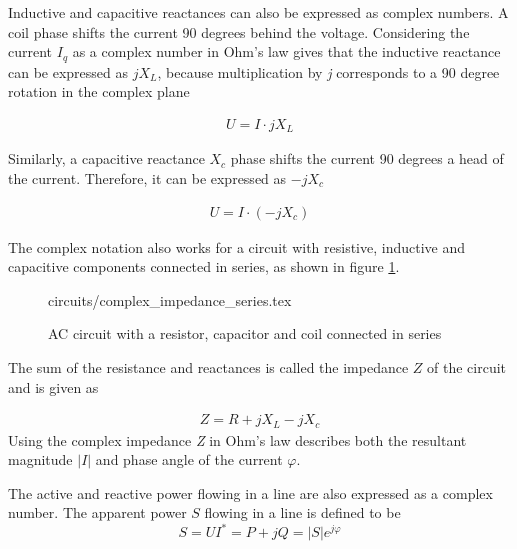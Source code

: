 \documentclass[class=book, crop=false]{standalone}
\begin{document}
Inductive and capacitive reactances can also be expressed as complex numbers. A coil phase shifts the current 90 degrees behind the voltage. Considering the current $I_{q}$ as a complex number in Ohm's law gives that the inductive reactance can be expressed as $jX_{L}$, because multiplication by \textit{j} corresponds to a 90 degree rotation in the complex plane

\begin{equation}
   \begin{aligned}\label{eq:theory:complex_rectance_capacitive}
U = I\cdot jX_{L}
\end{aligned} 
\end{equation}

Similarly, a capacitive reactance $X_{c}$ phase shifts the current 90 degrees a head of the current. Therefore, it can be expressed as $-jX_{c}$

\begin{equation}
   \begin{aligned}\label{eq:theory:complex_rectance_inductance}
U = I\cdot (-jX_{c})
\end{aligned} 
\end{equation}

The complex notation also works for a circuit with resistive, inductive and capacitive components connected in series, as shown in figure \ref{fig:theory:complex_impedance_series}.

\begin{figure}[ht!]
    \center
    {circuits/complex_impedance_series.tex}
    \caption[size = 9]
    {AC circuit with a resistor, capacitor and coil connected in series}\label{fig:theory:complex_impedance_series}
\end{figure}

The sum of the resistance and reactances is called the impedance $Z$ of the circuit and is given as

\begin{equation}
   \begin{aligned}\label{eq:theory:complex_impedance}
Z = R + jX_{L} - jX_{c}
\end{aligned} 
\end{equation}
Using the complex impedance \textit{Z} in Ohm's law describes both the resultant magnitude $|I|$ and phase angle of the current $\varphi$.

The active and reactive power flowing in a line are also expressed as a complex number. The apparent power $S$ flowing in a line is defined to be
\begin{equation}\label{eq:theory_apparent_power}
    S  = UI^{*} = P + jQ = |S|e^{j\varphi}
\end{equation}
\end{document}

